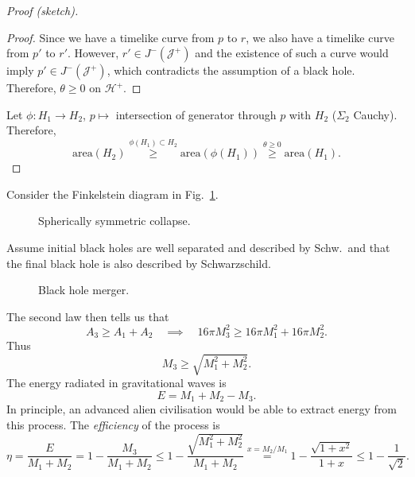 \begin{proof}[Proof (sketch)]
\begin{proof}
  Since we have a timelike curve from $p$ to $r$, we also have a timelike curve from $p'$ to $r'$. However, $r' \in J^- (\mathcal{J}^+)$ and the existence of such a curve would imply $p' \in J^- (\mathcal{J}^+)$, which contradicts the assumption of a black hole.
  Therefore, $\theta \geq 0$ on $\mathcal{H}^+$.
  \end{proof}
  Let $\phi \colon H_1 \to H_2$, $p \mapsto $ intersection of generator through $p$ with $H_2$ ($\Sigma_2$ Cauchy).
  Therefore,
  \begin{equation}
    \text{area} (H_2) \stackrel{\phi(H_1) \subset H_2}{\geq} \text{area}(\phi(H_1)) \stackrel{\theta \geq 0}{ \geq } \text{area} (H_1).
  \end{equation}
\end{proof}

\begin{example}
  Consider the Finkelstein diagram in Fig.~\ref{fig:l19f4}.
  \begin{figure}[ht]
    \centering
    \caption{Spherically symmetric collapse.}
    \label{fig:l19f4}
  \end{figure}
\end{example}

\begin{example}
  Assume initial black holes are well separated and described by Schw.~and that the final black hole is also described by Schwarzschild.
  \begin{figure}[ht]
    \centering
    \caption{Black hole merger.}
    \label{fig:l19f5}
  \end{figure}
  The second law then tells us that
  \begin{equation}
    A_3 \geq A_1 + A_2 \quad \implies \quad 16 \pi M_3^2 \geq 16 \pi M_1^2 + 16 \pi M_2^2.
  \end{equation}
  Thus
  \begin{equation}
    M_3 \geq \sqrt{M_1^2 + M_2^2}.
  \end{equation}
  The energy radiated in gravitational waves is 
  \begin{equation}
    E = M_1 + M_2 - M_3.
  \end{equation}
  In principle, an advanced alien civilisation would be able to extract energy from this process. The \emph{efficiency} of the process is
  \begin{equation}
    \eta = \frac{E}{M_1 + M_2} = 1 - \frac{M_3}{M_1 + M_2} \leq 1 - \frac{\sqrt{M_1^2 + M_2^2}}{M_1  + M_2} \stackrel{x = M_2 / M_1}{=} 1 - \frac{\sqrt{1 + x^2}}{1 + x} \leq 1 - \frac{1}{\sqrt{2}}.
  \end{equation}
\end{example}

